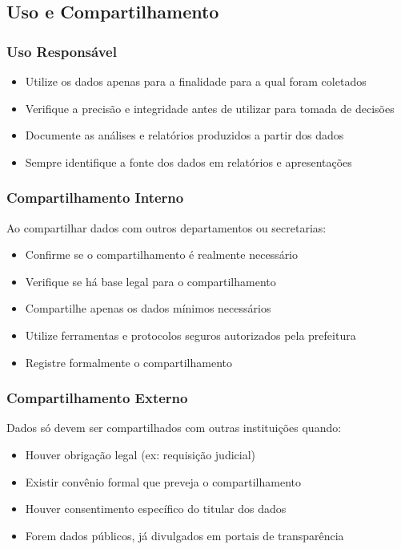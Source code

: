 \documentclass[12pt,a4paper]{article}
\begin{document}
\subsection{Uso e Compartilhamento}

\subsubsection{Uso Responsável}
\begin{itemize}
    \item Utilize os dados apenas para a finalidade para a qual foram coletados
    \item Verifique a precisão e integridade antes de utilizar para tomada de decisões
    \item Documente as análises e relatórios produzidos a partir dos dados
    \item Sempre identifique a fonte dos dados em relatórios e apresentações
\end{itemize}

\subsubsection{Compartilhamento Interno}
Ao compartilhar dados com outros departamentos ou secretarias:
\begin{itemize}
    \item Confirme se o compartilhamento é realmente necessário
    \item Verifique se há base legal para o compartilhamento
    \item Compartilhe apenas os dados mínimos necessários
    \item Utilize ferramentas e protocolos seguros autorizados pela prefeitura
    \item Registre formalmente o compartilhamento
\end{itemize}

\subsubsection{Compartilhamento Externo}
Dados só devem ser compartilhados com outras instituições quando:
\begin{itemize}
    \item Houver obrigação legal (ex: requisição judicial)
    \item Existir convênio formal que preveja o compartilhamento
    \item Houver consentimento específico do titular dos dados
    \item Forem dados públicos, já divulgados em portais de transparência
\end{itemize}
\end{document}
